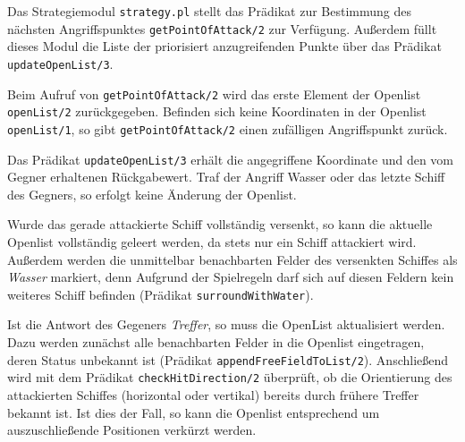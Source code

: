 	Das Strategiemodul \texttt{strategy.pl} stellt das Prädikat zur Bestimmung des nächsten Angriffspunktes \texttt{getPointOfAttack/2}
	zur Verfügung. Außerdem füllt dieses Modul die Liste der priorisiert anzugreifenden Punkte über das Prädikat \texttt{updateOpenList/3}. 
	
	Beim Aufruf von \texttt{getPointOfAttack/2} wird das erste Element der Openlist \texttt{openList/2} zurückgegeben.
	Befinden sich keine Koordinaten in der Openlist \texttt{openList/1}, so gibt \texttt{getPointOfAttack/2} einen zufälligen Angriffspunkt zurück.
	
	Das Prädikat \texttt{updateOpenList/3} erhält die angegriffene Koordinate und den vom Gegner erhaltenen Rückgabewert. 
	Traf der Angriff Wasser oder das letzte Schiff des Gegners, so erfolgt keine Änderung der Openlist.
	
	Wurde das gerade attackierte Schiff vollständig versenkt, so kann die aktuelle Openlist vollständig geleert werden, da stets nur ein 
	Schiff attackiert wird. Außerdem werden die unmittelbar benachbarten Felder des versenkten Schiffes als \textit{Wasser} markiert, denn
	Aufgrund der Spielregeln darf sich auf diesen Feldern kein weiteres Schiff befinden (Prädikat \texttt{surroundWithWater}). 
	
	Ist die Antwort des Gegeners \textit{Treffer}, so muss die OpenList aktualisiert werden. 
	Dazu werden zunächst alle benachbarten Felder in die Openlist eingetragen, deren Status unbekannt ist 
	(Prädikat \texttt{appendFreeFieldToList/2}). 
	Anschließend wird mit dem Prädikat \texttt{checkHitDirection/2} überprüft, ob die Orientierung 
	des attackierten Schiffes (horizontal oder vertikal) bereits durch frühere Treffer bekannt ist. 
	Ist dies der Fall, so kann die Openlist entsprechend um auszuschließende Positionen verkürzt werden.

